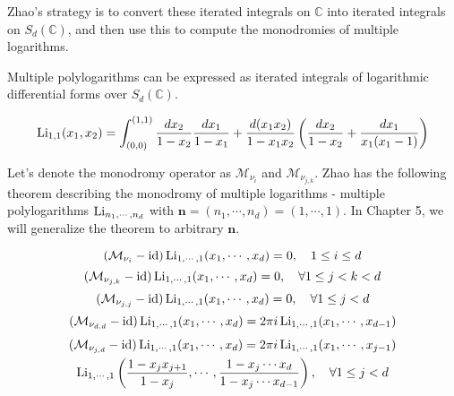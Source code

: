 Zhao's strategy is to convert these iterated integrals on $\mathbb C$ into iterated integrals on $S_d(\mathbb C)$, and then use this to compute the monodromies of multiple logarithms.

\begin{theorem}
Multiple polylogarithms can be expressed as iterated integrals of logarithmic differential forms over $S_d(\mathbb C)$.
\end{theorem}

\begin{example}
\begin{multline}
\operatorname{Li}_{1,1}(x_1,x_2)=\int_{(0,0)}^{(1,1)}\frac{dx_2}{1-x_2}\frac{dx_1}{1-x_1}+\frac{d(x_1x_2)}{1-x_1x_2}\left(\frac{dx_2}{1-x_2}+\frac{dx_1}{x_1(x_1-1)}\right)
\end{multline}
\end{example}

Let's denote the monodromy operator as $\mathcal M_{\nu_i}$ and $\mathcal M_{\nu_{j,k}}$. Zhao has the following theorem describing the monodromy of multiple logarithms - multiple polylogarithms $\operatorname{Li}_{n_1,\cdots,n_d}$ with $\mathbf n=(n_1,\cdots,n_d)=(1,\cdots,1)$. In Chapter 5,  we will generalize the theorem to arbitrary $\mathbf n$.

\begin{theorem}\label{thm: Zhao's monodromy thm}
\begin{equation}
(\mathcal M_{\nu_i}-\operatorname{id})\operatorname{Li}_{1,\cdots,1}(x_1,\cdots,x_d)=0,\quad 1\leq i\leq d
\end{equation}
\begin{equation}
(\mathcal M_{\nu_{j,k}}-\operatorname{id})\operatorname{Li}_{1,\cdots,1}(x_1,\cdots,x_d)=0,\quad\forall 1\leq j<k<d
\end{equation}
\begin{equation}
(\mathcal M_{\nu_{j,j}}-\operatorname{id})\operatorname{Li}_{1,\cdots,1}(x_1,\cdots,x_d)=0,\quad\forall 1\leq j<d
\end{equation}
\begin{equation}
(\mathcal M_{\nu_{d,d}}-\operatorname{id})\operatorname{Li}_{1,\cdots,1}(x_1,\cdots,x_d)=2\pi i\operatorname{Li}_{1,\cdots,1}(x_1,\cdots,x_{d-1})
\end{equation}
\begin{multline}
(\mathcal M_{\nu_{j,d}}-\operatorname{id})\operatorname{Li}_{1,\cdots,1}(x_1,\cdots,x_d)=2\pi i\operatorname{Li}_{1,\cdots,1}(x_1,\cdots,x_{j-1})\\
\operatorname{Li}_{1,\cdots,1}\left(\frac{1-x_jx_{j+1}}{1-x_j},\cdots,\frac{1-x_j\cdots x_d}{1-x_j\cdots x_{d-1}}\right),\quad \forall 1\leq j<d
\end{multline}
\end{theorem}

